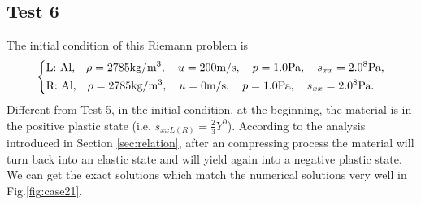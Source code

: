 \documentclass{article}
\numberwithin{equation}{section}
\numberwithin{table}{section}
\begin{document}
\subsection{Test 6}
The initial condition of this Riemann problem is
\begin{equation}
 \left\{ \begin{aligned}
	 &	 \text{L: Al,}\quad  \rho = 2785 \text{kg}/\text{m}^3, \quad  u = 200\text{m}/\text{s}, \quad  p = 1.0 \text{Pa}, \quad  s_{xx}=2.0\time 10^8 \text{Pa},\\
	 &	 \text{R: Al,}\quad  \rho = 2785 \text{kg}/\text{m}^3, \quad  u = 0\text{m}/\text{s}, \quad  p = 1.0\text{Pa}, \quad  s_{xx}= 2.0 \time 10^8 \text{Pa}.\\
   \end{aligned}
 \right.
\end{equation}
Different from Test 5, in  the initial condition, at the beginning, the material is in the positive  plastic state (i.e. $s_{xxL(R)}=\frac{2}{3}{Y}^{0}$). According to the analysis introduced in Section \ref{sec:relation}, after an compressing  process the material will turn back into an elastic state and will yield again into a negative plastic state. We can get the exact  solutions which match the numerical solutions very well in Fig.\ref{fig:case21}.
\end{document}
